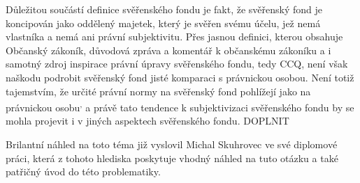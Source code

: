 \documentclass{article}
\begin{document}
Důležitou součástí definice svěřenského fondu je fakt, že svěřenský fond je koncipován jako oddělený majetek, který je svěřen svému účelu, jež nemá vlastníka a nemá ani právní subjektivitu. Přes jasnou definici, kterou obsahuje Občanský zákoník, důvodová zpráva a komentář k občanskému zákoníku a i samotný zdroj inspirace právní úpravy svěřenského fondu, tedy CCQ, není však naškodu podrobit svěřenský fond jisté komparaci s právnickou osobou. Není totiž tajemstvím, že určité právní normy na svěřenský fond pohlížejí jako na právnickou osobu\textsuperscript{,} a právě tato tendence k subjektivizaci svěřenského fondu by se mohla projevit i v jiných aspektech svěřenského fondu. DOPLNIT

Brilantní náhled na toto téma již vyslovil Michal Skuhrovec ve své diplomové práci, která z tohoto hlediska poskytuje vhodný náhled na tuto otázku a také patřičný úvod do této problematiky.



\end{document}
